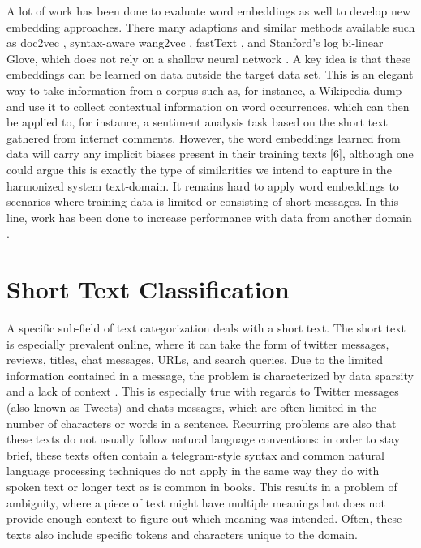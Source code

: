 A lot of work has been done to evaluate word embeddings as well to develop new embedding approaches. There many adaptions and similar methods available such as doc2vec \cite{Le2014}, syntax-aware wang2vec \cite{Ling2015}, fastText \cite{Bojanowski2016}, and Stanford’s log bi-linear Glove, which does not rely on a shallow neural network \cite{Pennington2014}.
A key idea is that these embeddings can be learned on data outside the target data set. This is an elegant way to take information from a corpus such as, for instance, a Wikipedia dump and use it to collect contextual information on word occurrences, which can then be applied to, for instance, a sentiment analysis task based on the short text gathered from internet comments. However, the word embeddings learned from data will carry any implicit biases present in their training texts [6], although one could argue this is exactly the type of similarities we intend to capture in the harmonized system text-domain. It remains hard to apply word embeddings to scenarios where training data is limited or consisting of short messages. In this line, work has been done to increase performance with data from another domain \cite{Abdelwahab2016}.


\section{Short Text Classification}

A specific sub-field of text categorization deals with a short text. The short text is especially prevalent online, where it can take the form of twitter messages, reviews, titles, chat messages, URLs, and search queries. Due to the limited information contained in a message, the problem is characterized by data sparsity and a lack of context \cite{Wang2017}. This is especially true with regards to Twitter messages (also known as Tweets) and chats messages, which are often limited in the number of characters or words in a sentence. Recurring problems are also that these texts do not usually follow natural language conventions: in order to stay brief, these texts often contain a telegram-style syntax and common natural language processing techniques do not apply in the same way they do with spoken text or longer text as is common in books. This results in a problem of ambiguity, where a piece of text might have multiple meanings but does not provide enough context to figure out which meaning was intended. Often, these texts also include specific tokens and characters unique to the domain. 

